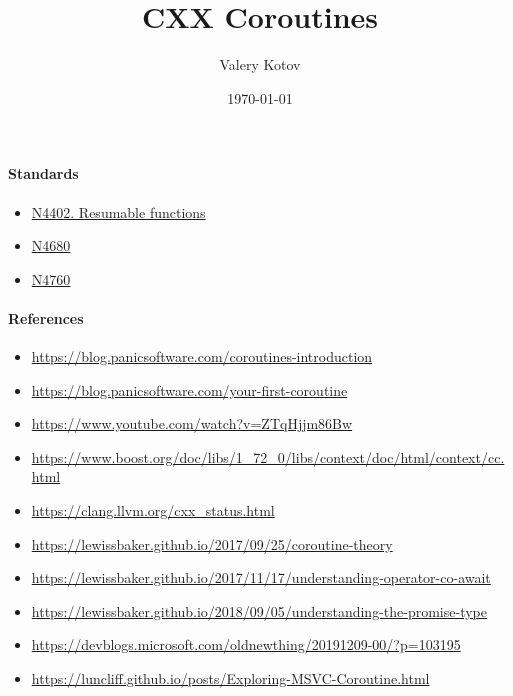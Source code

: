 \documentclass{article}
\title{CXX Coroutines}
\author{Valery Kotov}
\date{\today}
\begin{document}
\maketitle

\paragraph{Standards}

\begin{itemize}
\item \href{https://isocpp.org/files/papers/N4402.pdf}{N4402. Resumable functions}
\item \href{http://www.open-std.org/jtc1/sc22/wg21/docs/papers/2017/n4680.pdf}{N4680}
\item \href{http://www.open-std.org/jtc1/sc22/wg21/docs/papers/2018/n4760.pdf}{N4760}
\end{itemize}

\paragraph{References}

\begin{itemize}
\item \url{https://blog.panicsoftware.com/coroutines-introduction}
\item \url{https://blog.panicsoftware.com/your-first-coroutine}
\item \url{https://www.youtube.com/watch?v=ZTqHjjm86Bw}
\item \url{https://www.boost.org/doc/libs/1_72_0/libs/context/doc/html/context/cc.html}
\item \url{https://clang.llvm.org/cxx_status.html}
\item \url{https://lewissbaker.github.io/2017/09/25/coroutine-theory}
\item \url{https://lewissbaker.github.io/2017/11/17/understanding-operator-co-await}
\item \url{https://lewissbaker.github.io/2018/09/05/understanding-the-promise-type}
\item \url{https://devblogs.microsoft.com/oldnewthing/20191209-00/?p=103195}
\item \url{https://luncliff.github.io/posts/Exploring-MSVC-Coroutine.html}
\end{itemize}
\end{document}
